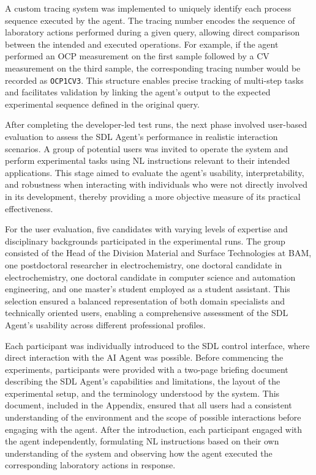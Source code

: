 A custom tracing system was implemented to uniquely identify each process sequence executed by the agent. The tracing number encodes the sequence of laboratory actions performed during a given query, allowing direct comparison between the intended and executed operations. For example, if the agent performed an OCP measurement on the first sample followed by a CV measurement on the third sample, the corresponding tracing number would be recorded as \texttt{OCP1CV3}. This structure enables precise tracking of multi-step tasks and facilitates validation by linking the agent’s output to the expected experimental sequence defined in the original query.

After completing the developer-led test runs, the next phase involved user-based evaluation to assess the SDL Agent’s performance in realistic interaction scenarios. A group of potential users was invited to operate the system and perform experimental tasks using NL instructions relevant to their intended applications. This stage aimed to evaluate the agent’s usability, interpretability, and robustness when interacting with individuals who were not directly involved in its development, thereby providing a more objective measure of its practical effectiveness.




For the user evaluation, five candidates with varying levels of expertise and disciplinary backgrounds participated in the experimental runs. The group consisted of the Head of the Division Material and Surface Technologies at BAM, one postdoctoral researcher in electrochemistry, one doctoral candidate in electrochemistry, one doctoral candidate in computer science and automation engineering, and one master’s student employed as a student assistant. This selection ensured a balanced representation of both domain specialists and technically oriented users, enabling a comprehensive assessment of the SDL Agent’s usability across different professional profiles.

Each participant was individually introduced to the SDL control interface, where direct interaction with the AI Agent was possible. Before commencing the experiments, participants were provided with a two-page briefing document describing the SDL Agent’s capabilities and limitations, the layout of the experimental setup, and the terminology understood by the system. This document, included in the Appendix, ensured that all users had a consistent understanding of the environment and the scope of possible interactions before engaging with the agent. After the introduction, each participant engaged with the agent independently, formulating NL instructions based on their own understanding of the system and observing how the agent executed the corresponding laboratory actions in response.

